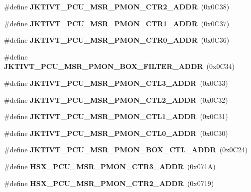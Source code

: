 \begin{DoxyCompactItemize}
\item 
\mbox{\label{types_8h_a885b6391b439a80833f8ef07cd3234d5}} 
\#define {\bfseries J\+K\+T\+I\+V\+T\+\_\+\+P\+C\+U\+\_\+\+M\+S\+R\+\_\+\+P\+M\+O\+N\+\_\+\+C\+T\+R2\+\_\+\+A\+D\+DR}~(0x0\+C38)
\item 
\mbox{\label{types_8h_a001e67bf4a4feb7152a931b060723a04}} 
\#define {\bfseries J\+K\+T\+I\+V\+T\+\_\+\+P\+C\+U\+\_\+\+M\+S\+R\+\_\+\+P\+M\+O\+N\+\_\+\+C\+T\+R1\+\_\+\+A\+D\+DR}~(0x0\+C37)
\item 
\mbox{\label{types_8h_a9ede207a8291e0310820bbfdc37aef1d}} 
\#define {\bfseries J\+K\+T\+I\+V\+T\+\_\+\+P\+C\+U\+\_\+\+M\+S\+R\+\_\+\+P\+M\+O\+N\+\_\+\+C\+T\+R0\+\_\+\+A\+D\+DR}~(0x0\+C36)
\item 
\mbox{\label{types_8h_a7e85eccc481d06a6519bfd51154c7ae6}} 
\#define {\bfseries J\+K\+T\+I\+V\+T\+\_\+\+P\+C\+U\+\_\+\+M\+S\+R\+\_\+\+P\+M\+O\+N\+\_\+\+B\+O\+X\+\_\+\+F\+I\+L\+T\+E\+R\+\_\+\+A\+D\+DR}~(0x0\+C34)
\item 
\mbox{\label{types_8h_ab97bae97fd7d1c56857e5f89c119173f}} 
\#define {\bfseries J\+K\+T\+I\+V\+T\+\_\+\+P\+C\+U\+\_\+\+M\+S\+R\+\_\+\+P\+M\+O\+N\+\_\+\+C\+T\+L3\+\_\+\+A\+D\+DR}~(0x0\+C33)
\item 
\mbox{\label{types_8h_a178bd4aecdb96cb83d4de4f07ffec300}} 
\#define {\bfseries J\+K\+T\+I\+V\+T\+\_\+\+P\+C\+U\+\_\+\+M\+S\+R\+\_\+\+P\+M\+O\+N\+\_\+\+C\+T\+L2\+\_\+\+A\+D\+DR}~(0x0\+C32)
\item 
\mbox{\label{types_8h_a0a9b3838ddd114ec631262849f2734ce}} 
\#define {\bfseries J\+K\+T\+I\+V\+T\+\_\+\+P\+C\+U\+\_\+\+M\+S\+R\+\_\+\+P\+M\+O\+N\+\_\+\+C\+T\+L1\+\_\+\+A\+D\+DR}~(0x0\+C31)
\item 
\mbox{\label{types_8h_a1a3668e652ba91a65d67f5384fa8d3fb}} 
\#define {\bfseries J\+K\+T\+I\+V\+T\+\_\+\+P\+C\+U\+\_\+\+M\+S\+R\+\_\+\+P\+M\+O\+N\+\_\+\+C\+T\+L0\+\_\+\+A\+D\+DR}~(0x0\+C30)
\item 
\mbox{\label{types_8h_a0f6f4bf765e37b43b61d6990ebbf8f1b}} 
\#define {\bfseries J\+K\+T\+I\+V\+T\+\_\+\+P\+C\+U\+\_\+\+M\+S\+R\+\_\+\+P\+M\+O\+N\+\_\+\+B\+O\+X\+\_\+\+C\+T\+L\+\_\+\+A\+D\+DR}~(0x0\+C24)
\item 
\mbox{\label{types_8h_ad134650f1639391f3d610c70ef9f1e96}} 
\#define {\bfseries H\+S\+X\+\_\+\+P\+C\+U\+\_\+\+M\+S\+R\+\_\+\+P\+M\+O\+N\+\_\+\+C\+T\+R3\+\_\+\+A\+D\+DR}~(0x071\+A)
\item 
\mbox{\label{types_8h_ab8068f1d692e5ced75fd5262c5d8cb8f}} 
\#define {\bfseries H\+S\+X\+\_\+\+P\+C\+U\+\_\+\+M\+S\+R\+\_\+\+P\+M\+O\+N\+\_\+\+C\+T\+R2\+\_\+\+A\+D\+DR}~(0x0719)

\end{DoxyCompactItemize}
